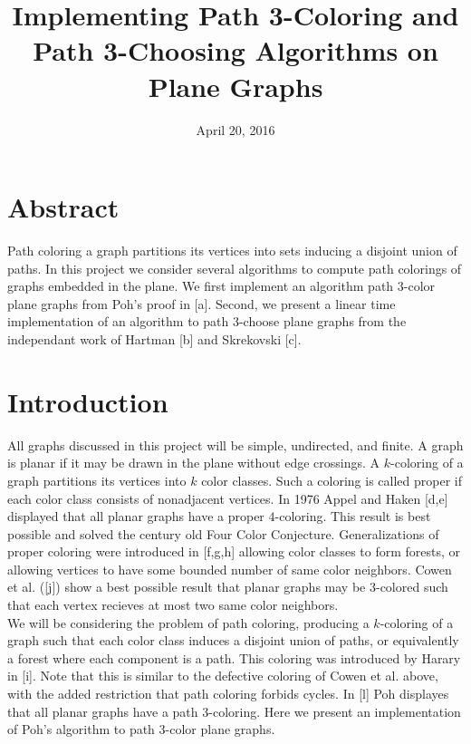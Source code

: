 \documentclass[11pt,letter]{article}
\begin{document}
\title{Implementing Path 3-Coloring and Path 3-Choosing Algorithms on Plane Graphs}
\date{April 20, 2016}

\maketitle

\section*{Abstract}

Path coloring a graph partitions its vertices into sets inducing a disjoint union of paths. In this project
we consider several algorithms to compute path colorings of graphs embedded in the plane. We
first implement an algorithm path 3-color plane graphs from Poh's proof in [a]. Second, we present a linear time
implementation of an algorithm to path 3-choose plane graphs from the independant work of Hartman [b] and
Skrekovski [c].

\section{Introduction}

All graphs discussed in this project will be simple, undirected, and finite. A graph is planar if it may
be drawn in the plane without edge crossings. A $k$-coloring of a graph partitions
its vertices into $k$ color classes. Such a coloring is called proper if each color class consists of
nonadjacent vertices. In 1976 Appel and Haken [d,e] displayed that all planar graphs have a proper $4$-coloring.
This result is best possible and solved the century old Four Color Conjecture.
Generalizations of proper coloring were introduced in [f,g,h] allowing color classes to form forests, or allowing vertices
to have some bounded number of same color neighbors. Cowen et al. ([j]) show a best possible result that planar
graphs may be $3$-colored such that each vertex recieves at most two same color neighbors.\\

\noindent We will be considering the problem of path coloring, producing a $k$-coloring of a graph such that each color
class induces a disjoint union of paths, or equivalently a forest where each component is a path. This coloring
was introduced by Harary in [i]. Note that this is similar to the defective coloring of Cowen et al. above,
with the added restriction that path coloring forbids cycles. In [l] Poh displayes that all
planar graphs have a path $3$-coloring. Here we present an implementation of Poh's algorithm to path
$3$-color plane graphs.\\
\end{document}
